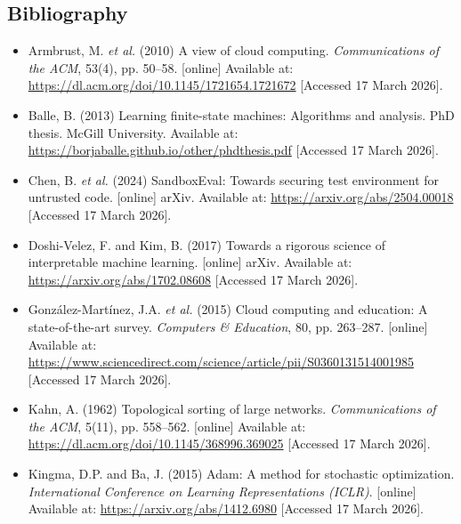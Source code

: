 \documentclass{article}
\begin{document}
\subsection{Bibliography} %

\begin{itemize}
\item Armbrust, M. \emph{et al.} (2010) A view of cloud computing. \emph{Communications of the ACM}, 53(4), pp. 50--58. [online] Available at: \url{https://dl.acm.org/doi/10.1145/1721654.1721672} [Accessed 17 March 2026]. %

\item Balle, B. (2013) Learning finite-state machines: Algorithms and analysis. PhD thesis. McGill University. Available at: \url{https://borjaballe.github.io/other/phdthesis.pdf} [Accessed 17 March 2026]. %

\item Chen, B. \emph{et al.} (2024) SandboxEval: Towards securing test environment for untrusted code. [online] arXiv. Available at: \url{https://arxiv.org/abs/2504.00018} [Accessed 17 March 2026]. %

\item Doshi-Velez, F. and Kim, B. (2017) Towards a rigorous science of interpretable machine learning. [online] arXiv. Available at: \url{https://arxiv.org/abs/1702.08608} [Accessed 17 March 2026]. %


\item González-Martínez, J.A. \emph{et al.} (2015) Cloud computing and education: A state-of-the-art survey. \emph{Computers \& Education}, 80, pp. 263--287. [online] Available at: \url{https://www.sciencedirect.com/science/article/pii/S0360131514001985} [Accessed 17 March 2026]. %


\item Kahn, A. (1962) Topological sorting of large networks. \emph{Communications of the ACM}, 5(11), pp. 558--562. [online] Available at: \url{https://dl.acm.org/doi/10.1145/368996.369025} [Accessed 17 March 2026]. %

\item Kingma, D.P. and Ba, J. (2015) Adam: A method for stochastic optimization. \emph{International Conference on Learning Representations (ICLR)}. [online] Available at: \url{https://arxiv.org/abs/1412.6980} [Accessed 17 March 2026]. %


\end{itemize}
\end{document}
